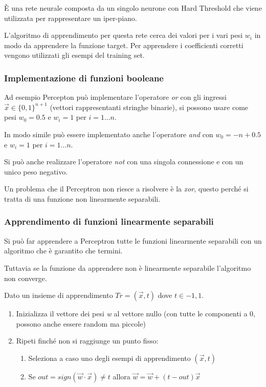 È una rete neurale composta da un singolo neurone con Hard Threshold che
viene utilizzata per rappresentare un iper-piano.

L'algoritmo di apprendimento per questa rete cerca dei valori per i vari
pesi $w_i$ in modo da apprendere la funzione target. Per apprendere
i coefficienti corretti vengono utilizzati gli esempi del training set.

\subsubsection{Implementazione di funzioni booleane}\label{implementazione-di-funzioni-booleane}

Ad esempio Percepton può implementare l'operatore \emph{or} con gli
ingressi $\vec{x} \in \{0,1\}^{n+1}$ (vettori rappresentanti stringhe
binarie), si possono usare come pesi $w_0 = 0.5$ e $w_i = 1$
per $i = 1 \ldots n$.

In modo simile può essere implementato anche l'operatore \emph{and} con
$w_0 = -n+0.5$ e $w_i = 1$ per $i = 1 \ldots n$.

Si può anche realizzare l'operatore \emph{not} con una singola
connessione e con un unico peso negativo.

Un problema che il Perceptron non riesce a risolvere è la \emph{xor},
questo perché si tratta di una funzione non linearmente separabili.

\subsubsection{Apprendimento di funzioni linearmente separabili}\label{apprendimento-di-funzioni-linearmente-separabili}

Si può far apprendere a Perceptron tutte le funzioni linearmente
separabili con un algoritmo che è garantito che termini.

Tuttavia se la funzione da apprendere non è linearmente separabile
l'algoritmo non converge.

Dato un insieme di apprendimento $Tr = {(\vec{x},t)}$ dove $t \in {-1,1}$.

\begin{enumerate}
\item
  Inizializza il vettore dei pesi \emph{w} al vettore nullo (con tutte
  le componenti a 0, possono anche essere random ma piccole)
\item
  Ripeti finché non si raggiunge un punto fisso:

  \begin{enumerate}
  \item
    Seleziona a caso uno degli esempi di apprendimento $(\vec{x},t)$
  \item
    Se $out = sign(\vec{w} \cdot \vec{x}) \neq t$ allora $\vec{w} = \vec{w} + (t - out)\vec{x}$
  \end{enumerate}
\end{enumerate}

